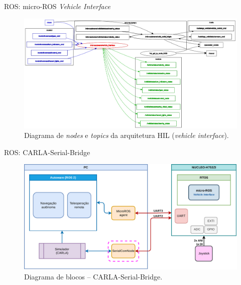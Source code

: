 \documentclass{if-beamer}
\begin{document}
\begin{frame}{ROS: micro-ROS \textit{Vehicle Interface} }

\begin{figure}[H]
	\centering
	\includegraphics[width=0.95\linewidth]{ros_graph_vi}
	\caption{Diagrama de \textit{nodes} e \textit{topics} da arquitetura HIL (\textit{vehicle interface}).}
	\label{fig:ros_graph_vi}
\end{figure}

\end{frame}

\begin{frame}{ROS: CARLA-Serial-Bridge}

\begin{figure}[H]
	\centering
	\includegraphics[width=0.9\linewidth]{carla_bridge_nodes_scope}
	\caption{Diagrama de blocos -- CARLA-Serial-Bridge.}
	\label{fig:carla_bridge_nodes_scope}
\end{figure}	

\end{frame}
\end{document}
